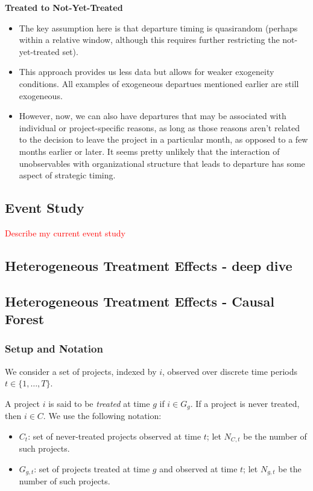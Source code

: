 \documentclass[source/paper/main.tex]{subfiles}
\begin{document}
\textbf{Treated to Not-Yet-Treated}
\begin{itemize}
    \item The key assumption here is that departure timing is quasirandom (perhaps within a relative window, although this requires further restricting the not-yet-treated set).
    \item This approach provides us less data but allows for weaker exogeneity conditions. All examples of exogeneous departues mentioned earlier are still exogeneous. 
    \item However, now, we can also have departures that may be associated with individual or project-specific reasons, as long as those reasons aren't related to the decision to leave the project in a particular month, as opposed to a few months earlier or later. It seems pretty unlikely that the interaction of unobservables with organizational structure that leads to departure has some aspect of strategic timing. 
\end{itemize}

\subsection{Event Study}
\textcolor{red}{Describe my current event study}
\subsection{Heterogeneous Treatment Effects - deep dive}

\subsection{Heterogeneous Treatment Effects - Causal Forest}
\subsubsection{Setup and Notation}

We consider a set of projects, indexed by $i$, observed over discrete time periods $t \in \{1, \dotsc, T\}$. 

A project $i$ is said to be \emph{treated} at time $g$ if $i \in G_g$. If a project is never treated, then $i \in C$. We use the following notation:
\begin{itemize}
    \item $C_t$: set of never-treated projects observed at time $t$; let $N_{C,t}$ be the number of such projects.
    \item $G_{g,t}$: set of projects treated at time $g$ and observed at time $t$; let $N_{g,t}$ be the number of such projects.
\end{itemize}
\end{document}

